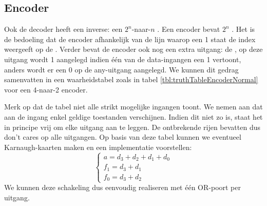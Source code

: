 \subsection{Encoder}
\label{ss:encoder}
Ook de decoder heeft een inverse: een $2^n$-naar-$n$ . Een encoder bevat $2^n$ . Het is de bedoeling dat de encoder afhankelijk van de lijn waarop een 1 staat de index weergeeft op de . Verder bevat de encoder ook nog een extra uitgang: de , op deze uitgang wordt 1 aangelegd indien \'e\'en van de data-ingangen een 1 vertoont, anders wordt er een 0 op de any-uitgang aangelegd. We kunnen dit gedrag samenvatten in een waarheidstabel zoals in tabel \ref{tbl:truthTableEncoderNormal} voor een 4-naar-2 encoder.
\begin{table}[hbt]
\centering
{}
\caption{Waarheidtabellen van een encoder en prioriteitsencoder.}
\end{table}
Merk op dat de tabel niet alle strikt mogelijke ingangen toont. We nemen aan dat aan de ingang enkel geldige toestanden verschijnen. Indien dit niet zo is, staat het in principe vrij om elke uitgang aan te leggen. De ontbrekende rijen bevatten dus don't cares op alle uitgangen. Op basis van deze tabel kunnen we eventueel Karnaugh-kaarten maken en een implementatie voorstellen:
\begin{equation}
\left\{
\begin{array}{l}
a=d_3+d_2+d_1+d_0\\
f_1=d_3+d_1\\
f_0=d_3+d_2
\end{array}
\right.
\end{equation}
We kunnen deze schakeling dus eenvoudig realiseren met \'e\'en OR-poort per uitgang.
